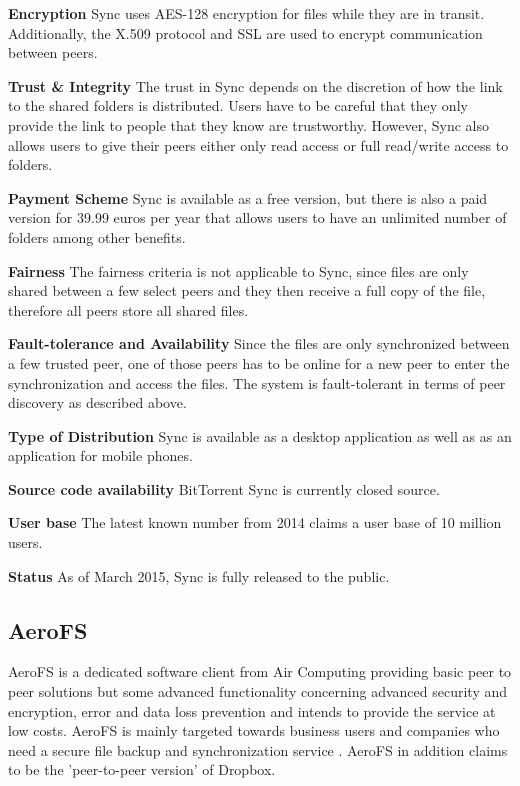 \textbf{Encryption}
Sync uses AES-128 encryption for files while they are in transit. Additionally, the X.509 protocol and SSL are used to encrypt communication between peers.

\textbf{Trust \& Integrity}
The trust in Sync depends on the discretion of how the link to the shared folders is distributed. Users have to be careful that they only provide the link to people that they know are trustworthy. However, Sync also allows users to give their peers either only read access or full read/write access to folders.

\textbf{Payment Scheme}
Sync is available as a free version, but there is also a paid version for 39.99 euros per year that allows users to have an unlimited number of folders among other benefits.

\textbf{Fairness}
The fairness criteria is not applicable to Sync, since files are only shared between a few select peers and they then receive a full copy of the file, therefore all peers store all shared files.

\textbf{Fault-tolerance and Availability}
Since the files are only synchronized between a few trusted peer, one of those peers has to be online for a new peer to enter the synchronization and access the files. The system is fault-tolerant in terms of peer discovery as described above.

\textbf{Type of Distribution}
Sync is available as a desktop application as well as as an application for mobile phones.

\textbf{Source code availability}
BitTorrent Sync is currently closed source.

\textbf{User base}
The latest known number from 2014 claims a user base of 10 million users.

\textbf{Status}
As of March 2015, Sync is fully released to the public.

\subsection{AeroFS}
AeroFS is a dedicated software client from Air Computing providing basic peer to peer solutions but some advanced functionality concerning advanced security and encryption, error and data loss prevention and intends to provide the service at low costs. AeroFS is mainly targeted towards business users and companies who need a secure file backup and synchronization service \cite{aerofs}. AeroFS in addition claims to be the 'peer-to-peer version' of Dropbox.

